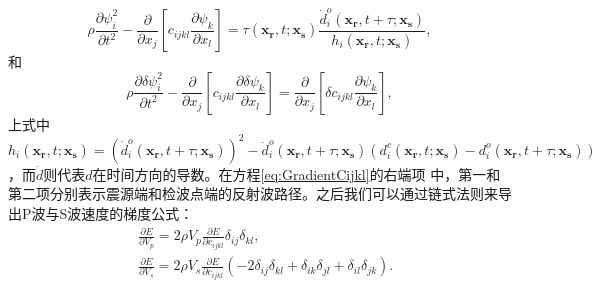 \begin{equation}
    \rho \frac{\partial \psi^2_i}{\partial t^2}  -
    \frac{\partial}{\partial x_j}\left[ 
        c_{ijkl}\frac{\partial \psi_{k}}{\partial
        x_l}\right]=\tau(\mathbf{x_r},t;\mathbf{x_s})\frac{\dot{d}^o_i(\mathbf{x_r},t+\tau;\mathbf{x_s})}{h_i(\mathbf{x_r},t;\mathbf{x_s})},
    \label{eq:AdjointWE} 
\end{equation}
和
\begin{equation}
    \rho \frac{\partial \delta \psi^2_i}{\partial t^2}  -
    \frac{\partial}{\partial x_j}\left[ 
        c_{ijkl}\frac{\partial \delta \psi_{k}}{\partial 
        x_l}\right]=\frac{\partial}{\partial x_j}\left[\delta c_{ijkl}\frac{\partial
        \psi_{k}}{\partial x_l}\right], 
    \label{eq:AdjointDeltaWE} 
\end{equation}
上式中$h_i(\mathbf{x_r},t;\mathbf{x_s})=(\dot{d}^o_i(\mathbf{x_r},t+\tau;\mathbf{x_s}))^2-\ddot{d}^o_i(\mathbf{x_r},t+\tau;\mathbf{x_s})
(d^c_i(\mathbf{x_r},t;\mathbf{x_s})-d^o_i(\mathbf{x_r},t+\tau;\mathbf{x_s}))$，而$\dot{d}$则代表$d$在时间方向的导数。在方程\eqref{eq:GradientCijkl}的右端项
中，第一和第二项分别表示震源端和检波点端的反射波路径。之后我们可以通过链式法则来导出P波与S波速度的梯度公式：
\begin{equation}
\begin{split}
    &\frac{\partial E}{\partial V_p}=2\rho V_p\frac{\partial E}{\partial
        c_{ijkl}}\delta_{ij}\delta_{kl}, \\
    &\frac{\partial E}{\partial V_s}=2\rho V_s\frac{\partial
    E}{\partial c_{ijkl}}(-2\delta_{ij}\delta_{kl}+\delta_{ik}\delta_{jl}+
    \delta_{il}\delta_{jk}).
\end{split}
    \label{eq:GradientVel}
\end{equation}
